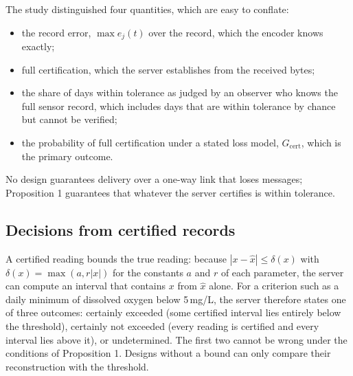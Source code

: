 The study distinguished four quantities, which are easy to conflate:
\begin{itemize}
  \item the record error, $\max e_j(t)$ over the record, which the encoder knows exactly;
  \item full certification, which the server establishes from the received bytes;
  \item the share of days within tolerance as judged by an observer who knows the full sensor record, which includes days that are within tolerance by chance but cannot be verified;
  \item the probability of full certification under a stated loss model, $G_{\mathrm{cert}}$, which is the primary outcome.
\end{itemize}
No design guarantees delivery over a one-way link that loses messages; Proposition 1 guarantees that whatever the server certifies is within tolerance.

\subsection{Decisions from certified records}
\label{sec:decisions}
A certified reading bounds the true reading: because $|x - \hat{x}| \le \delta(x)$ with $\delta(x) = \max(a, r|x|)$ for the constants $a$ and $r$ of each parameter, the server can compute an interval that contains $x$ from $\hat{x}$ alone. For a criterion such as a daily minimum of dissolved oxygen below 5\,mg/L, the server therefore states one of three outcomes: certainly exceeded (some certified interval lies entirely below the threshold), certainly not exceeded (every reading is certified and every interval lies above it), or undetermined. The first two cannot be wrong under the conditions of Proposition 1. Designs without a bound can only compare their reconstruction with the threshold.
